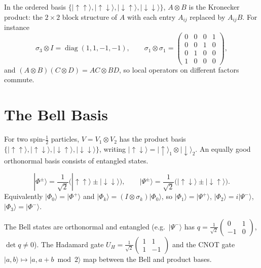 \begin{example}
In the ordered basis $\{|{\uparrow\uparrow}\rangle,|{\uparrow\downarrow}\rangle,|{\downarrow\uparrow}\rangle,|{\downarrow\downarrow}\rangle\}$, $A\otimes B$ is the Kronecker product: the $2\times2$ block structure of $A$ with each entry $A_{ij}$ replaced by $A_{ij}B$. For instance
\[
    \sigma_3\otimes I = \operatorname{diag}(1,1,-1,-1),
    \qquad
    \sigma_1\otimes\sigma_1 = \begin{pmatrix}0&0&0&1\\0&0&1&0\\0&1&0&0\\1&0&0&0\end{pmatrix},
\]
and $(A\otimes B)(C\otimes D) = AC\otimes BD$, so local operators on different factors commute.
\end{example}

\section{The Bell Basis}

For two spin-$\frac12$ particles, $V = V_1\otimes V_2$ has the product basis $\{|{\uparrow\uparrow}\rangle,|{\uparrow\downarrow}\rangle,|{\downarrow\uparrow}\rangle,|{\downarrow\downarrow}\rangle\}$, writing $|{\uparrow\downarrow}\rangle = |{\uparrow}\rangle_1\otimes|{\downarrow}\rangle_2$. An equally good orthonormal basis consists of entangled states.

\begin{definition}
\[
    |\Phi^\pm\rangle = \frac{1}{\sqrt2}\bigl(|{\uparrow\uparrow}\rangle\pm|{\downarrow\downarrow}\rangle\bigr),
    \qquad
    |\Psi^\pm\rangle = \frac{1}{\sqrt2}\bigl(|{\uparrow\downarrow}\rangle\pm|{\downarrow\uparrow}\rangle\bigr).
\]
Equivalently $|\Phi_0\rangle = |\Phi^+\rangle$ and $|\Phi_k\rangle = (I\otimes\sigma_k)|\Phi_0\rangle$, so $|\Phi_1\rangle = |\Psi^+\rangle$, $|\Phi_2\rangle = i|\Psi^-\rangle$, $|\Phi_3\rangle = |\Phi^-\rangle$.
\end{definition}

The Bell states are orthonormal and entangled (e.g.\ $|\Psi^-\rangle$ has $q = \frac{1}{\sqrt2}\begin{pmatrix}0&1\\-1&0\end{pmatrix}$, $\det q\neq0$). The Hadamard gate $U_H = \frac{1}{\sqrt2}\begin{pmatrix}1&1\\1&-1\end{pmatrix}$ and the CNOT gate $|a,b\rangle\mapsto|a,a+b\bmod2\rangle$ map between the Bell and product bases.

